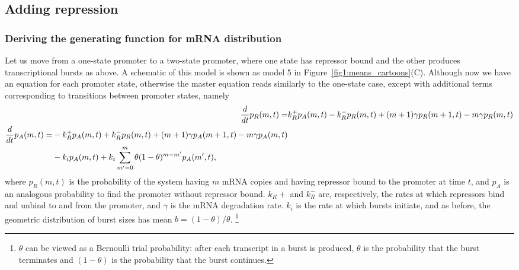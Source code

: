 \subsection{Adding repression}
\subsubsection{Deriving the generating function for mRNA distribution}

Let us move from a one-state promoter to a two-state promoter, where one state
has repressor bound and the other produces transcriptional bursts as above.
A schematic of this model is shown as model 5 in
Figure~\ref{fig1:means_cartoons}(C). Although now we have an equation for each
promoter state, otherwise the master equation reads similarly to the one-state
case, except with additional terms corresponding to transitions between promoter
states, namely
\begin{align}
{d\over dt}p_R(m,t) =& 
k_R^+ p_A(m,t) - k_R^- p_R(m,t)
        + (m+1)\gamma p_R(m+1,t) - m\gamma p_R(m,t)
\\
\begin{split}
{d\over dt}p_A(m,t) =& - k_R^+ p_A(m,t) + k_R^- p_R(m,t)
        + (m+1)\gamma p_A(m+1,t) - m\gamma p_A(m,t) 
\\
&- k_i p_A(m,t) + k_i \sum_{m^\prime=0}^m \theta(1-\theta)^{m-m^\prime} p_A(m^\prime,t),
\end{split}
\end{align}
where $p_R(m,t)$ is the probability of the system having $m$ mRNA copies and
having repressor bound to the promoter at time $t$, and $p_A$ is an analogous
probability to find the promoter without repressor bound. $k_R+$ and $k_R^-$
are, respectively, the rates at which repressors bind and unbind to and from the
promoter, and $\gamma$ is the mRNA degradation rate. $k_i$ is the rate at which
bursts initiate, and as before, the geometric distribution of burst sizes has
mean $b=(1-\theta)/\theta$.
\footnote{
$\theta$ can be viewed as a Bernoulli trial probability: after each transcript
in a burst is produced, $\theta$ is the probability that the burst terminates
and $(1-\theta)$ is the probability that the burst continues.
}

